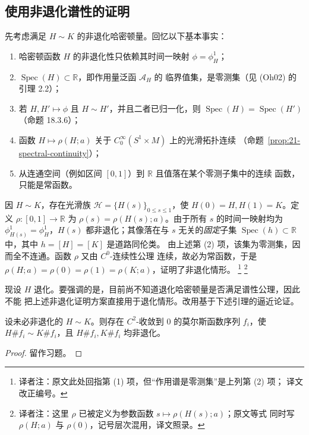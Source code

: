 \subsection{使用非退化谱性的证明}

先考虑满足 $H\sim K$ 的非退化哈密顿量。回忆以下基本事实：
\begin{enumerate}[label=(\arabic*)]
 \item 哈密顿函数 $H$ 的非退化性只依赖其时间一映射 $\phi=\phi_H^1$；
 \item $\operatorname{Spec}(H)\subset\mathbb R$，即作用量泛函 $\mathcal A_H$ 的
 临界值集，是零测集（见 (Oh02) 的引理 2.2）；
 \item 若 $H,H'\mapsto\phi$ 且 $H\sim H'$，并且二者已归一化，则
 $\operatorname{Spec}(H)=\operatorname{Spec}(H')$（命题 18.3.6）；
 \item 函数 $H\mapsto\rho(H;a)$ 关于 $C_0^\infty(S^1\times M)$ 上的光滑拓扑连续
 （命题~\ref{prop:21-spectral-continuity}）；
 \item 从连通空间（例如区间 $[0,1]$）到 $\mathbb R$ 且值落在某个零测子集中的连续
 函数，只能是常函数。
\end{enumerate}

因 $H\sim K$，存在光滑族 $\mathcal H=\{H(s)\}_{0\leq s\leq1}$，使
$H(0)=H,H(1)=K$。定义 $\rho:[0,1]\to\mathbb R$ 为
$\rho(s)=\rho(H(s);a)$。由于所有 $s$ 的时间一映射均为
$\phi_{H(s)}^1=\phi_H^1$，$H(s)$ 都非退化；其像落在与 $s$ 无关的\emph{固定}子集
$\operatorname{Spec}(h)\subset\mathbb R$ 中，其中 $h=[H]=[K]$ 是道路同伦类。
由上述第 (2) 项，该集为零测集，因而全不连通。函数 $\rho$ 又由 $C^0$-连续性公理
连续，故必为常函数，于是
$\rho(H;a)=\rho(0)=\rho(1)=\rho(K;a)$，证明了非退化情形。
\footnote{译者注：原文此处回指第 (1) 项，但“作用谱是零测集”是上列第 (2) 项；
译文改正编号。}
\footnote{译者注：这里 $\rho$ 已被定义为参数函数 $s\mapsto\rho(H(s);a)$；原文等式
同时写 $\rho(H;a)$ 与 $\rho(0)$，记号层次混用，译文照录。}

现设 $H$ 退化。要强调的是，目前尚不知道退化哈密顿量是否满足谱性公理，因此不能
把上述非退化证明方案直接用于退化情形。改用基于下述引理的逼近论证。

\begin{lemma}
\label{lem:21-common-morse-perturbation}
设未必非退化的 $H\sim K$。则存在 $C^2$-收敛到 $0$ 的莫尔斯函数序列 $f_i$，使
$H\#f_i\sim K\#f_i$，且 $H\#f_i,K\#f_i$ 均非退化。
\end{lemma}

\begin{proof}
留作习题。
\end{proof}

